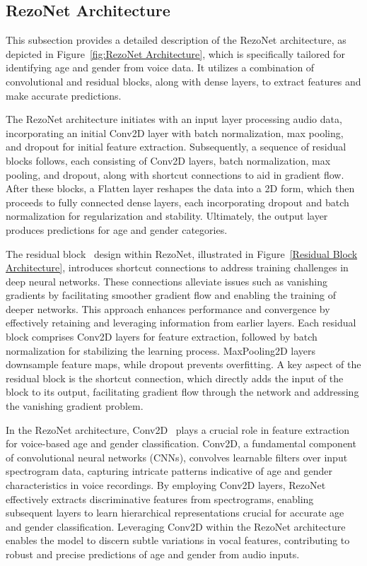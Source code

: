 \documentclass[conference, 10pt,onecolumn]{IEEEtran}
\begin{document}
\subsection{RezoNet Architecture}

This subsection provides a detailed description of the RezoNet architecture, as depicted in Figure~\ref{fig:RezoNet Architecture}, which is specifically tailored for identifying age and gender from voice data. It utilizes a combination of convolutional and residual blocks, along with dense layers, to extract features and make accurate predictions. 

The RezoNet architecture initiates with an input layer processing audio data, incorporating an initial Conv2D layer with batch normalization, max pooling, and dropout for initial feature extraction. Subsequently, a sequence of residual blocks follows, each consisting of Conv2D layers, batch normalization, max pooling, and dropout, along with shortcut connections to aid in gradient flow. After these blocks, a Flatten layer reshapes the data into a 2D form, which then proceeds to fully connected dense layers, each incorporating dropout and batch normalization for regularization and stability. Ultimately, the output layer produces predictions for age and gender categories.

The residual block~\cite{park2022generative} design within RezoNet, illustrated in Figure~\ref{Residual Block Architecture}, introduces shortcut connections to address training challenges in deep neural networks. These connections alleviate issues such as vanishing gradients by facilitating smoother gradient flow and enabling the training of deeper networks. This approach enhances performance and convergence by effectively retaining and leveraging information from earlier layers. Each residual block comprises Conv2D layers for feature extraction, followed by batch normalization for stabilizing the learning process. MaxPooling2D layers downsample feature maps, while dropout prevents overfitting. A key aspect of the residual block is the shortcut connection, which directly adds the input of the block to its output, facilitating gradient flow through the network and addressing the vanishing gradient problem.

In the RezoNet architecture, Conv2D~\cite{agarwal2021new} plays a crucial role in feature extraction for voice-based age and gender classification. Conv2D, a fundamental component of convolutional neural networks (CNNs), convolves learnable filters over input spectrogram data, capturing intricate patterns indicative of age and gender characteristics in voice recordings. By employing Conv2D layers, RezoNet effectively extracts discriminative features from spectrograms, enabling subsequent layers to learn hierarchical representations crucial for accurate age and gender classification. Leveraging Conv2D within the RezoNet architecture enables the model to discern subtle variations in vocal features, contributing to robust and precise predictions of age and gender from audio inputs.
\end{document}
